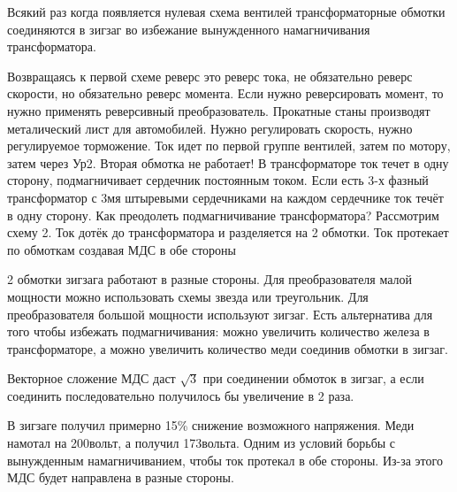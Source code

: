 Всякий раз когда появляется нулевая схема вентилей трансформаторные обмотки
соединяются в зигзаг во избежание вынужденного намагничивания трансформатора.

Возвращаясь к первой схеме реверс это реверс тока, не обязательно реверс скорости,
но обязательно реверс момента.
Если нужно реверсировать момент, то нужно применять реверсивный преобразователь.
Прокатные станы производят металический лист для автомобилей. Нужно регулировать скорость, нужно регулируемое торможение.
Ток идет по первой группе вентилей, затем по мотору, затем через Ур2.
Вторая обмотка не работает! В трансформаторе ток течет в одну сторону,
подмагничивает сердечник постоянным током. Если есть 3-х фазный трансформатор с
3мя штыревыми сердечниками на каждом сердечнике ток течёт в одну сторону.
Как преодолеть подмагничивание трансформатора? Рассмотрим схему 2. Ток дотёк
до трансформатора и разделяется на 2 обмотки. Ток протекает по обмоткам
создавая МДС в обе стороны
2 обмотки зигзага работают в разные стороны. Для преобразователя малой мощности
можно использовать схемы звезда или треугольник. Для преобразователя большой
мощности используют зигзаг. Есть альтернатива для того чтобы избежать
подмагничивания: можно увеличить количество железа в трансформаторе, а
можно увеличить количество меди соединив обмотки в зигзаг.
Векторное сложение МДС даст $\sqrt{3}$ при соединении обмоток в зигзаг,
а если соединить последовательно получилось бы увеличение в 2 раза.
В зигзаге получил примерно 15\% снижение возможного напряжения. Меди намотал на
200вольт, а получил 173вольта.
Одним из условий борьбы с вынужденным намагничиванием, чтобы ток протекал
в обе стороны. Из-за этого МДС будет направлена в разные стороны.

